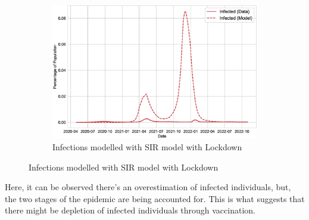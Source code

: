 \documentclass[tikz,fleqn,12pt]{wlscirep}
\begin{document}
\begin{figure}[H]\ContinuedFloat
  \begin{subfigure}[t]{\textwidth}
    \centering
    \includegraphics[scale=0.50]{images/SIR_model_with_lockdown_infections_IND.eps}
    \caption{Infections modelled with SIR model with Lockdown}
    \label{fig:SIR_model_with_lockdown_infections_IND}
  \end{subfigure}
\end{figure}
Here, it can be observed there's an overestimation of infected individuals, but, the two stages of the epidemic are being accounted for. This is what suggests that there might be depletion of infected individuals through vaccination.
\end{document}
